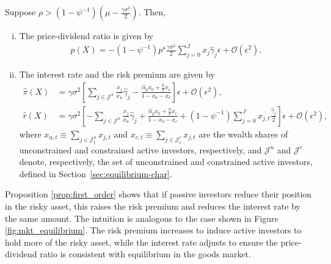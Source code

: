\begin{prop}\label{prop:first_order}
Suppose $\rho>\left(1-\psi^{-1}\right)\left( \mu - \frac{\gamma
\sigma^2}{2}  \right)$.
Then, 
\begin{enumerate}[(i)]
    \item The price-dividend ratio is given by
    \begin{align*}
        \hat{p}(X) = - (1-\psi^{-1}) p^\star \frac{\gamma \sigma^2}{2} \sum_{j=0}^J x_j \hat{\gamma}_j \epsilon + \mathcal{O}(\epsilon^2).
    \end{align*}    
    \item The interest rate and the risk premium are given by
    \begin{align*}
        \hat{\pi}(X) &=\gamma \sigma^2 \left[\sum_{j\in\mathcal{J}^u} \frac{x_j}{x_u} \hat{\gamma}_j -\frac{\hat{\alpha}_p  x_0+\frac{\hat{\sigma}}{\sigma} x_c }{1-x_0-x_c}\right]\epsilon + \mathcal{O}(\epsilon^2),\\
        \hat{r}(X) &= \gamma \sigma^2 \left[-\sum_{j\in\mathcal{J}^u} \frac{x_j}{x_u} \hat{\gamma}_j +\frac{\hat{\alpha}_p  x_0+\frac{\hat{\sigma}}{\sigma} x_c }{1-x_0-x_c}+\left(1-\psi^{-1}\right) \sum_{j=0}^{J} x_{j, t} \frac{\hat{\gamma}_{j}}{2}\right]\epsilon + \mathcal{O}(\epsilon^2),
    \end{align*}
    where $x_{u,t} \equiv \sum_{j\in \mathcal{J}_t^u} x_{j,t}$ and $x_{c,t} \equiv \sum_{j\in \mathcal{J}_t^c} x_{j,t}$ are the wealth shares of unconstrained and constrained active investors, respectively, and $\mathcal{J}^u $ and $\mathcal{J}^c $ denote, respectively, the set of unconstrained and constrained active investors, defined in Section~\ref{sec:equilibrium-char}. 
\end{enumerate}
\end{prop}

Proposition \ref{prop:first_order} shows that if passive investors reduce their position in the risky asset, this raises the risk premium and reduces the interest rate by the same amount. 
The intuition is analogous to the case shown in Figure \ref{fig:mkt_equilibrium}. 
The risk premium increases to induce active investors to hold more of the risky asset, while the interest rate adjusts to ensure the price-dividend ratio is consistent with equilibrium in the goods market.



